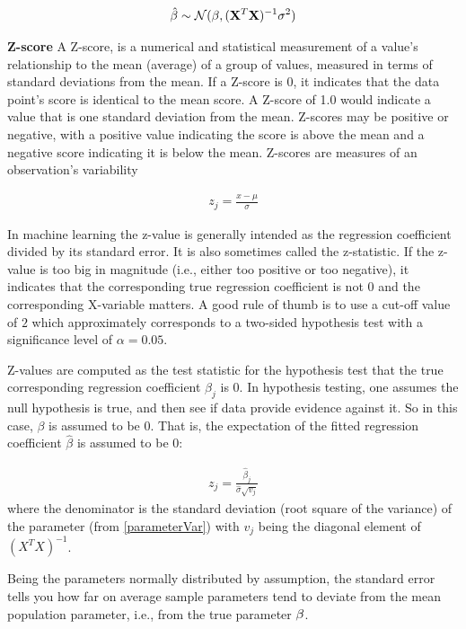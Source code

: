 \begin{align}
\label{parameterVar}
\hat{\beta} \sim \CMcal{N}(\beta,  (\X^T\X)^{-1} \sigma^2)
\end{align}

\begin{definition}{\textbf{Z-score}}
A Z-score, is a numerical and statistical measurement of a value's relationship to the mean (average) of a group of values, measured in terms of standard deviations from the mean. If a Z-score is 0, it indicates that the data point's score is identical to the mean score. A Z-score of 1.0 would indicate a value that is one standard deviation from the mean. Z-scores may be positive or negative, with a positive value indicating the score is above the mean and a negative score indicating it is below the mean. Z-scores are measures of an observation's variability

\begin{align}
z_j=\frac{x - \mu}{\sigma}
\end{align}

In machine learning the z-value is generally intended as the regression coefficient divided by its standard error. It is also sometimes called the z-statistic. If the z-value is too big in magnitude (i.e., either too positive or too negative), it indicates that the corresponding true regression coefficient is not $0$ and the corresponding X-variable matters. A good rule of thumb is to use a cut-off value of $2$ which approximately corresponds to a two-sided hypothesis test with a significance level of $\alpha=0.05$.

Z-values are computed as the test statistic for the hypothesis test that the true corresponding regression coefficient $\beta_j$ is $0$. In hypothesis testing, one assumes the null hypothesis is true, and then see if data provide evidence against it. So in this case, $\beta$ is assumed to be  $0$. That is, the expectation of the fitted regression coefficient $\hat{\beta}$ is assumed to be $0$:

\begin{align}
z_j =\frac{\hat{\beta}_j}{\hat{\sigma} \sqrt{v_j}}
\end{align}
where the denominator is the standard deviation (root square of the variance) of the parameter (from \autoref{parameterVar}) with $v_j$ being the diagonal element of $(X^TX)^{-1}$.
\end{definition}

Being the parameters normally distributed by assumption, the standard error tells you how far on average sample parameters tend to deviate from the mean population parameter, i.e., from the true parameter $\mathbf{\beta}$.

